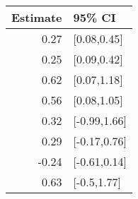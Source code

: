 \begin{tabular}{rl}
  \hline
Estimate & 95\% CI \\ 
  \hline
0.27 & [0.08,0.45] \\ 
  0.25 & [0.09,0.42] \\ 
  0.62 & [0.07,1.18] \\ 
  0.56 & [0.08,1.05] \\ 
  0.32 & [-0.99,1.66] \\ 
  0.29 & [-0.17,0.76] \\ 
  -0.24 & [-0.61,0.14] \\ 
  0.63 & [-0.5,1.77] \\ 
   \hline
\end{tabular}

